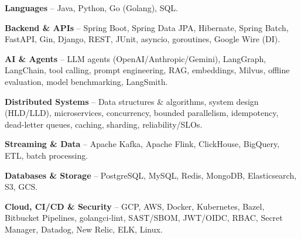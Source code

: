 \begin{zitemize}
\item \textbf{Languages} -- Java, Python, Go (Golang), SQL.
\item \textbf{Backend \& APIs} -- Spring Boot, Spring Data JPA, Hibernate, Spring Batch, FastAPI, Gin, Django, REST, JUnit, asyncio, goroutines, Google Wire (DI).
\item \textbf{AI \& Agents} -- LLM agents (OpenAI/Anthropic/Gemini), LangGraph, LangChain, tool calling, prompt engineering, RAG, embeddings, Milvus, offline evaluation, model benchmarking, LangSmith.
\item \textbf{Distributed Systems} -- Data structures \& algorithms, system design (HLD/LLD), microservices, concurrency, bounded parallelism, idempotency, dead-letter queues, caching, sharding, reliability/SLOs.
\item \textbf{Streaming \& Data} -- Apache Kafka, Apache Flink, ClickHouse, BigQuery, ETL, batch processing.
\item \textbf{Databases \& Storage} -- PostgreSQL, MySQL, Redis, MongoDB, Elasticsearch, S3, GCS.
\item \textbf{Cloud, CI/CD \& Security} -- GCP, AWS, Docker, Kubernetes, Bazel, Bitbucket Pipelines, golangci-lint, SAST/SBOM, JWT/OIDC, RBAC, Secret Manager, Datadog, New Relic, ELK, Linux.
\end{zitemize}
